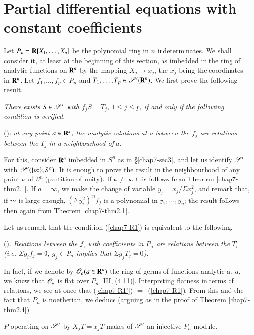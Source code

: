\section{Partial differential equations with constant coefficients}\label{chap7-sec4}

Let $P_{n}=\mathbf{R}[X_{1},\ldots,X_{n}]$ be the polynomial ring in $n$ indeterminates. We shall consider it, at least at the beginning of this section, as imbedded in the ring of analytic functions on $\mathbf{R}^{n}$ by the mapping $X_{j}\to x_{j}$, the $x_{j}$ being the coordinates in $\mathbf{R}^{n}$. Let $f_{1},\ldots,f_{p}\in P_{n}$ and $T_{1},\ldots,T_{p}\in \mathscr{S}'(\mathbf{R}^{n})$. We first prove the following result.

{\em There exists $S\in \mathscr{S}'$ with $f_{j}S=T_{j}$, $1\leq j\leq p$, if and only if the following condition is verified.}

()\label{chap7-R1}: {\em at any point $a\in \mathbf{R}^{n}$, the analytic relations at a between the $f_{j}$ are relations between the $T_{j}$ in a neighbourhood of $a$.}

For this, consider $\mathbf{R}^{n}$ imbedded in $S^{n}$ as in \S\ref{chap7-sec3}, and let us identify $\mathscr{S}'$ with $\mathscr{P}'(\{\infty\};S^{n})$. It is enough to prove the result in the neighbourhood of any point $a$ of $S^{n}$ (partition of unity). If $a\neq \infty$ this follows from Theorem \ref{chap7-thm2.1}. If $a=\infty$, we make the change of variable $y_{j}=x_{j}/\Sigma x^{2}_{j}$, and remark that, if $m$ is large enough, $(\Sigma y^{2}_{i})^{m}f_{j}$ is a polynomial in $y_{1},\ldots,y_{n}$; the result follows then again from Theorem \ref{chap7-thm2.1}.

Let us remark that the condition (\ref{chap7-R1}) is equivalent to the following.

()\label{chap7-R1'}. {\em Relations between the $f_{i}$ with coefficients in $P_{n}$ are relations between the $T_{i}$ ({\em i.e.} $\Sigma g_{i}f_{j}=0$, $g_{j}\in P_{n}$ implies that $\Sigma g_{j}T_{j}=0$).}

In fact, if we denote by $\mathscr{O}_{a}(a\in \mathbf{R}^{n})$ the ring of germs of functions analytic at $a$, we know that $\mathscr{O}_{a}$ is flat over $P_{n}$ [III, (4.11)]. Interpreting flatness in terms of relations, we see at once that (\ref{chap7-R1'}) $\Rightarrow$ (\ref{chap7-R1}). From this and the fact that $P_{n}$ is noetherian, we deduce (arguing as in the proof of Theorem \ref{chap7-thm2.4})

\begin{theorem}\label{chap7-thm4.1}
$P$ operating on $\mathscr{S}'$ by $X_{j}T=x_{j}T$ makes of $\mathscr{S}'$ an injective $P_{n}$-module.
\end{theorem}

